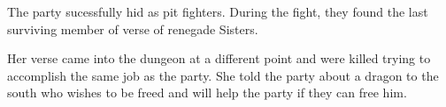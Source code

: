 The party sucessfully hid as pit fighters.
During the fight, they found the last surviving member of verse of renegade Sisters.

Her verse came into the dungeon at a different point and were killed trying to accomplish the same job as the party.
She told the party about a dragon to the south who wishes to be freed and will help the party if they can free him.